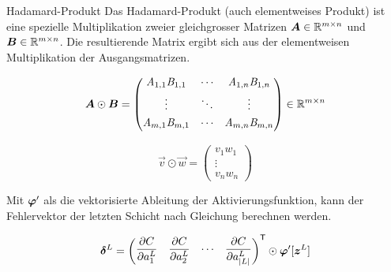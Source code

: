 \begin{appendices}
\begin{defbox}{Hadamard-Produkt}
  Das Hadamard-Produkt (auch elementweises Produkt) ist eine spezielle Multiplikation zweier gleichgrosser Matrizen
  $\bm{A} \in \mathbb{R}^{m \times n}$ und $\bm{B} \in \mathbb{R}^{m \times n}$.
  Die resultierende Matrix ergibt sich aus der elementweisen Multiplikation der Ausgangsmatrizen.

  \begin{minipage}{0.5\textwidth}
    \begin{equation*}
      \bm{A} \odot \bm{B} =
      \begin{pmatrix}
        \mathit{A}_{1,1} \mathit{B}_{1,1} & \cdots & \mathit{A}_{1,n} \mathit{B}_{1,n} \\[0.3em]
        \vdots & \ddots & \vdots \\[0.3em]
        \mathit{A}_{m,1} \mathit{B}_{m,1} & \cdots & \mathit{A}_{m,n} \mathit{B}_{m,n} \\[0.3em]
      \end{pmatrix}
      \in \mathbb{R}^{m \times n}
    \end{equation*}
  \end{minipage}
  \begin{minipage}{0.5\textwidth}
    \begin{equation*}
      \vec{v} \odot \vec{w} =
      \begin{pmatrix}
        v_1 w_1 \\
        \vdots \\
        v_n w_n
      \end{pmatrix}
    \end{equation*}

  \end{minipage}
\end{defbox}
\para{}

Mit $\bm{\varphi}'$ als die vektorisierte Ableitung der Aktivierungsfunktion,
kann der Fehlervektor der letzten Schicht nach Gleichung 
berechnen werden.

\begin{equation}\label{eq:RPh0}
  \bm{\delta}^L = \begin{pmatrix} \displaystyle\frac{\partial C}{\partial a_1^L} & \displaystyle\frac{\partial C}{\partial a_2^L} & \cdots & \displaystyle\frac{\partial C}{\partial a_{|L|}^L}\end{pmatrix}^{\mathsf{T}} \odot \bm{\varphi}'[\bm{z}^L]
\end{equation}


\end{appendices}
